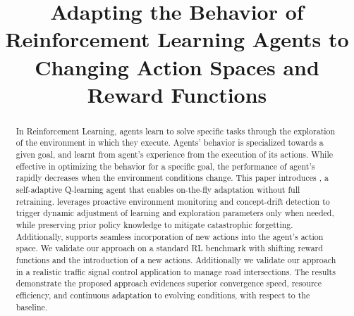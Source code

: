 \documentclass[10pt, conference, ]{IEEEtran}
\begin{document}
\title{Adapting the Behavior of Reinforcement Learning Agents to Changing Action Spaces and Reward Functions}

\author{
}

\maketitle




\begin{abstract}
In Reinforcement Learning, agents learn to solve specific tasks through the 
exploration of the environment in which they execute. Agents' behavior is
specialized towards a given goal, and learnt from agent's experience from the execution of its actions. While effective in optimizing the behavior for a 
specific goal, the performance of agent's rapidly decreases when the environment conditions change.
This paper introduces \adaptiverl, a self-adaptive Q-learning agent that enables on-the-fly adaptation 
without full retraining. \adaptiverl leverages proactive environment monitoring and concept-drift 
detection to trigger dynamic adjustment of learning and exploration parameters only when needed, 
while preserving prior policy knowledge to mitigate catastrophic forgetting. Additionally, \adaptiverl 
supports seamless incorporation of new actions into the agent’s action space. We validate our approach 
on a standard RL benchmark with shifting reward functions and the introduction of a new actions. 
Additionally we validate our approach in a realistic traffic signal control application to manage road 
intersections. The results demonstrate the proposed approach evidences superior convergence 
speed, resource efficiency, and continuous adaptation to evolving conditions, with respect to the 
baseline.
\end{abstract}
\end{document}
